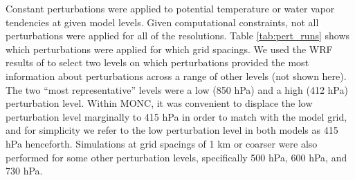 \documentclass[draft]{agujournal2019}
\begin{document}
Constant perturbations were applied to potential temperature or water vapor
tendencies at given model levels. Given computational constraints, not all
perturbations were applied for all of the resolutions.  Table
\ref{tab:pert_runs} shows which perturbations were applied for which grid
spacings. We used the WRF results of  to select two
levels on which perturbations provided the most information about perturbations
across a range of other levels (not shown here). The two ``most representative''
levels were a low (850 hPa) and a high (412 hPa) perturbation level. Within
MONC, it was convenient to displace the low perturbation level marginally to 415
hPa in order to match with the model grid, and for simplicity we refer to the
low perturbation level in both models as 415 hPa henceforth. Simulations at grid
spacings of 1 km or coarser were also performed for some other perturbation
levels, specifically 500 hPa, 600 hPa, and 730 hPa.
\end{document}
